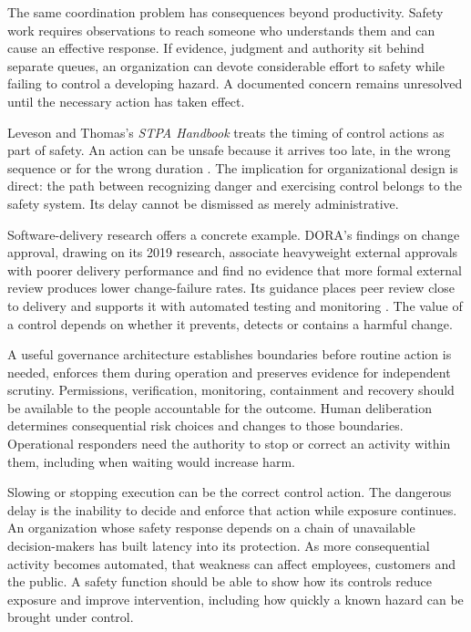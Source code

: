 \begin{EssayColumns}

The same coordination problem has consequences beyond productivity.
Safety work requires observations to reach someone who understands them
and can cause an effective response. If evidence, judgment and authority
sit behind separate queues, an organization can devote considerable
effort to safety while failing to control a developing hazard. A
documented concern remains unresolved until the necessary action has
taken effect.

Leveson and Thomas's \emph{STPA Handbook} treats the timing of control
actions as part of safety. An action can be unsafe because it arrives
too late, in the wrong sequence or for the wrong duration
\citep{leveson2018stpa}. The implication for organizational design is
direct: the path between recognizing danger and exercising control
belongs to the safety system. Its delay cannot be dismissed as merely
administrative.

Software-delivery research offers a concrete example. DORA's findings on
change approval, drawing on its 2019 research, associate heavyweight
external approvals with poorer delivery performance and find no evidence
that more formal external review produces lower change-failure rates.
Its guidance places peer review close to delivery and supports it with
automated testing and monitoring \citep{dorachangeapproval}. The value
of a control depends on whether it prevents, detects or contains a
harmful change.

\NextEssayColumn

A useful governance architecture establishes boundaries before routine
action is needed, enforces them during operation and preserves evidence
for independent scrutiny. Permissions, verification, monitoring,
containment and recovery should be available to the people accountable
for the outcome. Human deliberation determines consequential risk
choices and changes to those boundaries. Operational responders need the
authority to stop or correct an activity within them, including when
waiting would increase harm.

Slowing or stopping execution can be the correct control action. The
dangerous delay is the inability to decide and enforce that action while
exposure continues. An organization whose safety response depends on a
chain of unavailable decision-makers has built latency into its
protection. As more consequential activity becomes automated, that
weakness can affect employees, customers and the public. A safety
function should be able to show how its controls reduce exposure and
improve intervention, including how quickly a known hazard can be
brought under control.

\end{EssayColumns}

